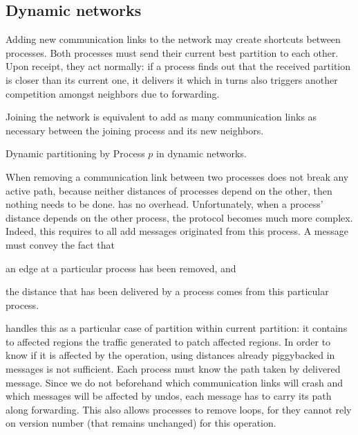 

\subsection{Dynamic networks}
Adding new communication links to the network may create shortcuts
between processes. Both processes must send their current best
partition to each other. Upon receipt, they act normally: if a process
finds out that the received partition is closer than its current one,
it delivers it which in turns also triggers another competition
amongst neighbors due to forwarding.

\noindent Joining the network is equivalent to add as many
communication links as necessary between the joining process and its
new neighbors.

\begin{algorithm}
  
  \caption{\label{algo:edges}Dynamic partitioning by Process $p$ in dynamic networks.}
\end{algorithm}

When removing a communication link between two processes does not
break any active path, because neither distances of processes depend
on the other, then nothing needs to be done. \NAME has no overhead.
Unfortunately, when a process' distance depends on the other process,
the protocol becomes much more complex. Indeed, this requires to
 all add messages originated from this process. A message
must convey the fact that
\begin{inparaenum}[(i)]
\item an edge at a particular process has been removed, and
\item the distance that has been delivered by a process comes from
  this particular process.
\end{inparaenum}

\noindent \NAME handles this as a particular case of partition within
current partition: it contains to affected regions the traffic
generated to patch affected regions. In order to know if it is
affected by the  operation, using distances already
piggybacked in messages is not sufficient.  Each process must know the
path taken by delivered message. Since we do not beforehand which
communication links will crash and which messages will be affected by
undos, each message has to carry its path along forwarding. This also
allows processes to remove loops, for they cannot rely on version
number (that remains unchanged) for this operation.

